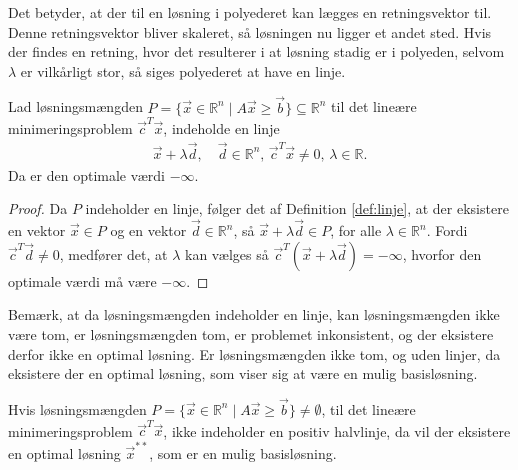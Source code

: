 Det betyder, at der til en løsning i polyederet kan lægges en retningsvektor til.
Denne retningsvektor bliver skaleret, så løsningen nu ligger et andet sted. 
Hvis der findes en retning, hvor det resulterer i at løsning stadig er i polyeden, selvom $\lambda$ er vilkårligt stor, så siges polyederet at have en linje.
\begin{prop}
Lad løsningsmængden $P = \{ \vec{x} \in \mathds{R}^n\mid A \vec{x} \geq \vec{b} \} \subseteq \mathds{R}^n $  til det lineære minimeringsproblem $\vec{c}^T\vec{x}$, indeholde en linje
\begin{align*}
\vec{x} + \lambda \vec{d}, \quad \vec{d}\in \mathds{R}^n, \, \vec{c}^T\vec{x} \neq 0, \, \lambda \in \mathds{R}.
\end{align*}
Da er den optimale værdi $-\infty$.
\end{prop}
\begin{proof}
Da $P$ indeholder en linje, følger det af Definition \ref{def:linje}, at der eksistere en vektor $\vec{x} \in P$ og en vektor $\vec{d} \in \mathds{R}^n$, så $\vec{x}+\lambda \vec{d} \in P$, for alle $\lambda \in \mathds{R}^n$. 
Fordi $\vec{c}^T\vec{d}\neq 0$, medfører det, at $\lambda$ kan vælges så $\vec{c}^T(\vec{x}+\lambda\vec{d}) = - \infty$, hvorfor den optimale værdi må være $-\infty$.
\end{proof}
Bemærk, at da løsningsmængden indeholder en linje, kan løsningsmængden ikke være tom, er løsningsmængden tom, er problemet inkonsistent, og der eksistere derfor ikke en optimal løsning. 
Er løsningsmængden ikke tom, og uden linjer, da eksistere der en optimal løsning, som viser sig at være en mulig basisløsning.
\begin{stn}
Hvis løsningsmængden $P =\{\vec{x} \in \mathds{R}^n\mid A \vec{x} \geq \vec{b} \} \neq \emptyset$, til det lineære minimeringsproblem $\vec{c}^T\vec{x}$, ikke indeholder en positiv halvlinje, da vil der eksistere en optimal løsning $\vec{x}^{**}$, som er en mulig basisløsning.
\label{stn:eksistens}
\end{stn}
